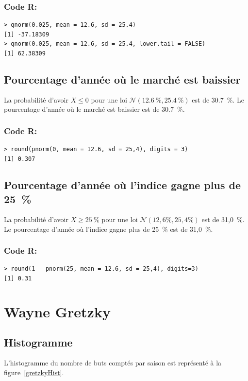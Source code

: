 \documentclass[10pt,twocolumn]{article}
\begin{document}
\subsubsection*{Code R:}
\begin{verbatim}
> qnorm(0.025, mean = 12.6, sd = 25.4)
[1] -37.18309
> qnorm(0.025, mean = 12.6, sd = 25.4, lower.tail = FALSE)
[1] 62.38309
\end{verbatim}


\subsection{Pourcentage d’année où le marché est baissier}
La probabilité d’avoir $X \leq 0$ pour une loi $\mathcal{N}(12.6~\%, 25.4~\%)$ est de 30.7~\%. Le pourcentage d’année où le marché est baissier est de 30.7~\%.

\subsubsection*{Code R:}
\begin{verbatim}
> round(pnorm(0, mean = 12.6, sd = 25,4), digits = 3)
[1] 0.307
\end{verbatim}


\subsection{Pourcentage d’année où l’indice gagne plus de 25~\%}
La probabilité d’avoir $X \geq 25~\%$ pour une loi $\mathcal{N}(12,6 \%, 25,4\%)$ est de 31,0~\%. Le pourcentage d’année où l’indice gagne plus de 25~\% est de 31,0~\%.

\subsubsection*{Code R:}
\begin{verbatim}
> round(1 - pnorm(25, mean = 12.6, sd = 25,4), digits=3)
[1] 0.31
\end{verbatim}



\section{Wayne Gretzky}
\subsection{Histogramme}
L’histogramme du nombre de buts comptés par saison est représenté à la figure~\ref{gretzkyHist}.
\end{document}
